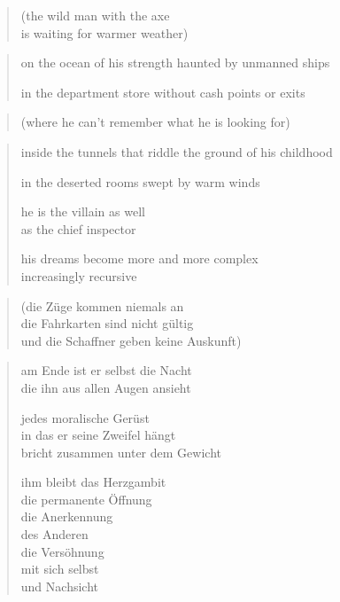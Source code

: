 {\begin{quote}
(the wild man with the axe\\
is waiting for warmer weather)
\end{quote}

\begin{verse}
on the ocean of his strength haunted by unmanned ships

in the department store without cash points or exits
\end{verse}

\begin{quote}
(where he can't remember what he is looking for)
\end{quote}

\begin{verse}
inside the tunnels that riddle the ground of his childhood

in the deserted rooms swept by warm winds

he is the villain as well\\
as the chief inspector

his dreams become more and more complex\\
increasingly recursive
\end{verse}

\restoregeometry

\clearpage

\begin{quote}
(die Züge kommen niemals an\\
die Fahrkarten sind nicht gültig\\
und die Schaffner geben keine Auskunft)
\end{quote}

\vspace*{\onelineskip}
\begin{verse}
am Ende ist er selbst die Nacht\\
die ihn aus allen Augen ansieht

jedes moralische Gerüst\\
in das er seine Zweifel hängt\\
bricht zusammen unter dem Gewicht

ihm bleibt das Herzgambit\\
die permanente Öffnung\\
die Anerkennung\\
des Anderen\\
die Versöhnung\\
mit sich selbst\\
und Nachsicht


\end{verse}}
